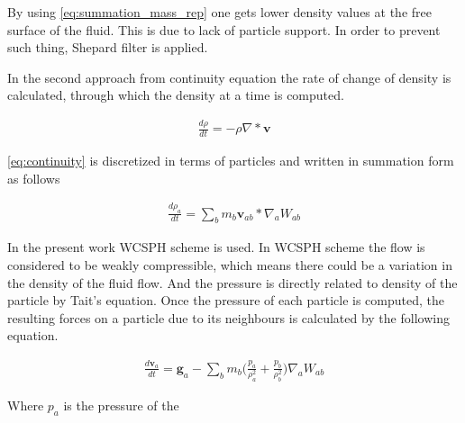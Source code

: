 By using \eqref{eq:summation_mass_rep} one gets lower density values
at the free surface of the fluid. This is due to lack of particle
support. In order to prevent such thing, Shepard filter is applied.

In the second approach from continuity equation the rate of change of
density is calculated, through which the density at a time is
computed.

\begin{align}
  \label{eq:continuity}
    \frac{d\rho}{dt} = -\rho \nabla * \textbf{v}
\end{align}

\eqref{eq:continuity} is discretized in terms of particles and written
in summation form as follows

\begin{align}
  \label{eq:sph_continuity}
    \frac{d\rho_a}{dt} = \sum_{b}m_b \textbf{v}_{ab} * \nabla_a W_{ab}
\end{align}

In the present work WCSPH scheme is used. In WCSPH scheme the flow is
considered to be weakly compressible, which means there could be a variation
in the density of the fluid flow. And the pressure is directly related to density
of the particle by Tait's equation. Once the pressure of each particle is computed, the
resulting forces on a particle due to its neighbours is calculated by the following equation.

\begin{align}
  \label{eq:sph_momentum}
    \frac{d\textbf{v}_a}{dt} = \textbf{g}_a  -\sum_{b}m_b \Bigg(\frac{p_a}{\rho^2_a} + \frac{p_b}{\rho^2_b}\Bigg) \nabla_a W_{ab}
\end{align}

Where $p_a$ is the pressure of the



